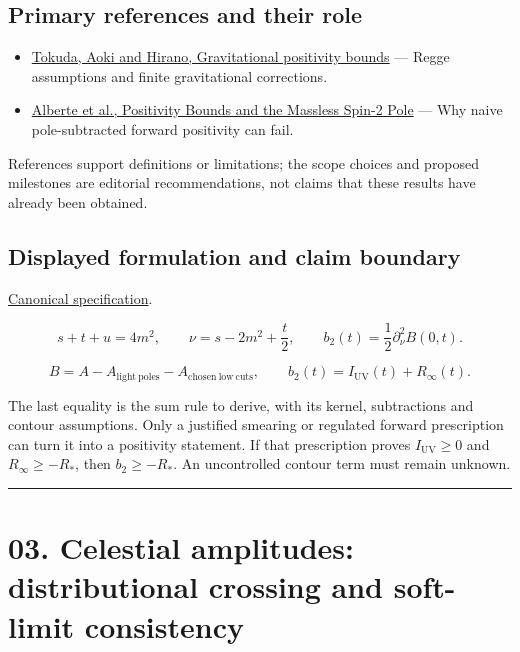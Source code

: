 \documentclass[
  11pt,
]{article}
\begin{document}
\subsection{Primary references and their role}

\begin{itemize}
\item
  \href{https://arxiv.org/abs/2007.15009}{Tokuda, Aoki and Hirano,
  Gravitational positivity bounds} --- Regge assumptions and finite
  gravitational corrections.
\item
  \href{https://arxiv.org/abs/2007.12667}{Alberte et al., Positivity
  Bounds and the Massless Spin-2 Pole} --- Why naive pole-subtracted
  forward positivity can fail.
\end{itemize}

References support definitions or limitations; the scope choices and
proposed milestones are editorial recommendations, not claims that these
results have already been obtained.

\subsection{Displayed formulation and claim boundary}

\href{https://github.com/rick-stevens-ai/Pure-Thought/blob/main/PRDs/02-Gravitational-Positivity-Bounds.md}{Canonical
specification}.

\[s+t+u=4m^2,\qquad \nu=s-2m^2+\frac t2,\qquad
b_2(t)=\frac12\partial_\nu^2 B(0,t).\]

\[B=A-A_{\mathrm{light\ poles}}-A_{\mathrm{chosen\ low\ cuts}},\qquad
b_2(t)=I_{\mathrm{UV}}(t)+R_\infty(t).\]

The last equality is the sum rule to derive, with its kernel,
subtractions and contour assumptions. Only a justified smearing or
regulated forward prescription can turn it into a positivity statement.
If that prescription proves \(I_{\mathrm{UV}}\ge0\) and
\(R_\infty\ge-R_*\), then \(b_2\ge-R_*\). An uncontrolled contour term
must remain unknown.

\begin{center}\rule{0.5\linewidth}{0.5pt}\end{center}

\section{03. Celestial amplitudes: distributional crossing and
soft-limit consistency}
\end{document}
